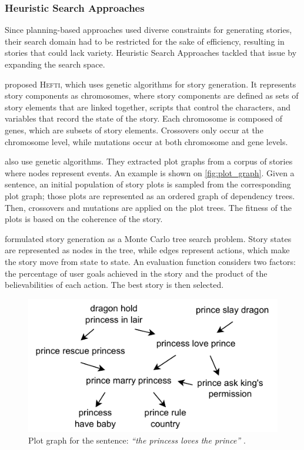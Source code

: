 \subsubsection{Heuristic Search Approaches}
Since planning-based approaches used diverse constraints for generating stories, their search domain had to be restricted for the sake of efficiency, resulting in stories that could lack variety. Heuristic Search Approaches tackled that issue by expanding the search space.

\citet{ong2004genetic} proposed \textsc{Hefti}, which uses genetic algorithms for story generation. It represents story components as chromosomes, where story components are defined as sets of story elements that are linked together, scripts that control the characters, and variables that record the state of the story. Each chromosome is composed of genes, which are subsets of story elements. Crossovers only occur at the chromosome level, while mutations occur at both chromosome and gene levels.

\citet{mcintyre2010plot} also use genetic algorithms. They extracted plot graphs from a corpus of stories where nodes represent events. An example is shown on \autoref{fig:plot_graph}. Given a sentence, an initial population of story plots is sampled from the corresponding plot graph; those plots are represented as an ordered graph of dependency trees. Then, crossovers and mutations are applied on the plot trees. The fitness of the plots is based on the coherence of the story.

\citet{kartal2014user} formulated story generation as a Monte Carlo tree search problem. Story states are represented as nodes in the tree, while edges represent actions, which make the story move from state to state. An evaluation function considers two factors: the percentage of user goals achieved in the story and the product of the believabilities of each action. The best story is then selected.

\begin{figure}
    \centering
    \includegraphics[width=0.7\columnwidth]{chapter2/pictures/plot_graph.pdf}
    \caption{Plot graph for the sentence: \emph{``the princess loves the prince''} \citep{mcintyre2010plot}.}
    \label{fig:plot_graph}
\end{figure}

